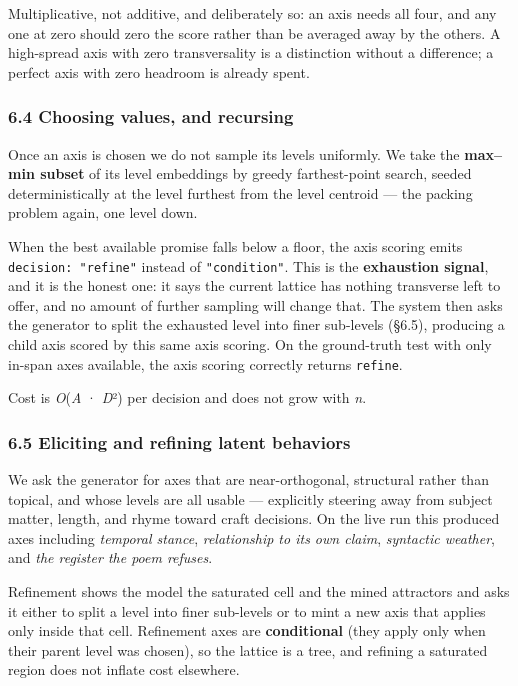 \documentclass[
  10pt,
]{article}
\theoremstyle{plain}
\theoremstyle{definition}
\begin{document}
Multiplicative, not additive, and deliberately so: an axis needs all
four, and any one at zero should zero the score rather than be averaged
away by the others. A high-spread axis with zero transversality is a
distinction without a difference; a perfect axis with zero headroom is
already spent.

\subsubsection{6.4 Choosing values, and
recursing}\label{64-choosing-values-and-recursing}

Once an axis is chosen we do not sample its levels uniformly. We take
the \textbf{max--min subset} of its level embeddings by greedy
farthest-point search, seeded deterministically at the level furthest
from the level centroid --- the packing problem again, one level down.

When the best available promise falls below a floor, the axis scoring
emits \texttt{decision:\ "refine"} instead of \texttt{"condition"}. This
is the \textbf{exhaustion signal}, and it is the honest one: it says the
current lattice has nothing transverse left to offer, and no amount of
further sampling will change that. The system then asks the generator to
split the exhausted level into finer sub-levels (§6.5), producing a
child axis scored by this same axis scoring. On the ground-truth test
with only in-span axes available, the axis scoring correctly returns
\texttt{refine}.

Cost is \emph{O}(\textbar{}\emph{A}\textbar{} · \emph{D}²) per decision
and does not grow with \emph{n}.

\subsubsection{6.5 Eliciting and refining latent
behaviors}\label{65-eliciting-and-refining-latent-behaviors}

We ask the generator for axes that are near-orthogonal, structural
rather than topical, and whose levels are all usable --- explicitly
steering away from subject matter, length, and rhyme toward craft
decisions. On the live run this produced axes including \emph{temporal
stance}, \emph{relationship to its own claim}, \emph{syntactic weather},
and \emph{the register the poem refuses}.

Refinement shows the model the saturated cell and the mined attractors
and asks it either to split a level into finer sub-levels or to mint a
new axis that applies only inside that cell. Refinement axes are
\textbf{conditional} (they apply only when their parent level was
chosen), so the lattice is a tree, and refining a saturated region does
not inflate cost elsewhere.
\end{document}
